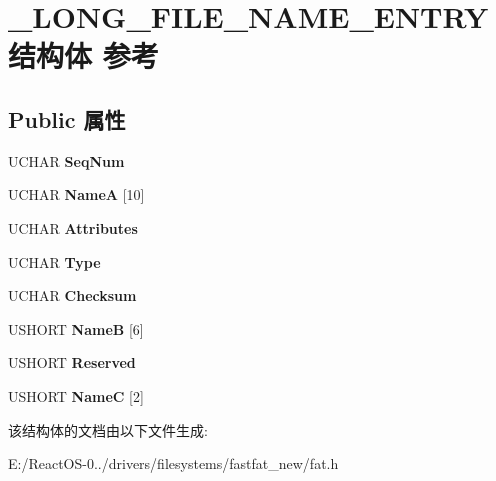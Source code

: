 \hypertarget{struct___l_o_n_g___f_i_l_e___n_a_m_e___e_n_t_r_y}{}\section{\+\_\+\+L\+O\+N\+G\+\_\+\+F\+I\+L\+E\+\_\+\+N\+A\+M\+E\+\_\+\+E\+N\+T\+R\+Y结构体 参考}
\label{struct___l_o_n_g___f_i_l_e___n_a_m_e___e_n_t_r_y}
\subsection*{Public 属性}
\begin{DoxyCompactItemize}
\item 
\mbox{\label{struct___l_o_n_g___f_i_l_e___n_a_m_e___e_n_t_r_y_a682ae5d3f7a6937c8106ebb645d46791}} 
U\+C\+H\+AR {\bfseries Seq\+Num}
\item 
\mbox{\label{struct___l_o_n_g___f_i_l_e___n_a_m_e___e_n_t_r_y_a6060383b27487032484caa00becd4df0}} 
U\+C\+H\+AR {\bfseries NameA} \mbox{[}10\mbox{]}
\item 
\mbox{\label{struct___l_o_n_g___f_i_l_e___n_a_m_e___e_n_t_r_y_a7520f210b7663910b7ab9d23204986c9}} 
U\+C\+H\+AR {\bfseries Attributes}
\item 
\mbox{\label{struct___l_o_n_g___f_i_l_e___n_a_m_e___e_n_t_r_y_aaa5260223e23a0a9bac1c4910800da90}} 
U\+C\+H\+AR {\bfseries Type}
\item 
\mbox{\label{struct___l_o_n_g___f_i_l_e___n_a_m_e___e_n_t_r_y_af48b1adfed18ec18b429a8f73c49e49a}} 
U\+C\+H\+AR {\bfseries Checksum}
\item 
\mbox{\label{struct___l_o_n_g___f_i_l_e___n_a_m_e___e_n_t_r_y_ad3f3909f7d09825f15781e2de4a3e43a}} 
U\+S\+H\+O\+RT {\bfseries NameB} \mbox{[}6\mbox{]}
\item 
\mbox{\label{struct___l_o_n_g___f_i_l_e___n_a_m_e___e_n_t_r_y_ad0710ce18fc99f1b133f0509b0ad3a7e}} 
U\+S\+H\+O\+RT {\bfseries Reserved}
\item 
\mbox{\label{struct___l_o_n_g___f_i_l_e___n_a_m_e___e_n_t_r_y_aca86ab9e3c8acaa390ad9fc56c99de5b}} 
U\+S\+H\+O\+RT {\bfseries NameC} \mbox{[}2\mbox{]}
\end{DoxyCompactItemize}


该结构体的文档由以下文件生成\+:\begin{DoxyCompactItemize}
\item 
E\+:/\+React\+O\+S-\/0../drivers/filesystems/fastfat\+\_\+new/fat.\+h\end{DoxyCompactItemize}
